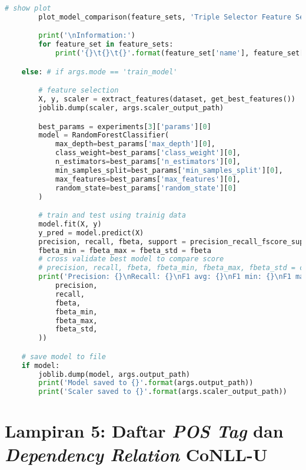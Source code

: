 \begin{lstlisting}[language=Python]
        # show plot
        plot_model_comparison(feature_sets, 'Triple Selector Feature Sets Performance', cv, score_field='cv_score')

        print('\nInformation:')
        for feature_set in feature_sets:
            print('{}\t{}\t{}'.format(feature_set['name'], feature_set['desc'], feature_set['features']))

    else: # if args.mode == 'train_model'

        # feature selection
        X, y, scaler = extract_features(dataset, get_best_features())
        joblib.dump(scaler, args.scaler_output_path)

        best_params = experiments[3]['params'][0]
        model = RandomForestClassifier(
            max_depth=best_params['max_depth'][0],
            class_weight=best_params['class_weight'][0],
            n_estimators=best_params['n_estimators'][0],
            min_samples_split=best_params['min_samples_split'][0],
            max_features=best_params['max_features'][0],
            random_state=best_params['random_state'][0]
        )

        # train and test using trainig data
        model.fit(X, y)
        y_pred = model.predict(X)
        precision, recall, fbeta, support = precision_recall_fscore_support(y, y_pred, average='binary')
        fbeta_min = fbeta_max = fbeta_std = fbeta
        # cross validate best model to compare score
        # precision, recall, fbeta, fbeta_min, fbeta_max, fbeta_std = cross_validate_precision_recall_fbeta(model, X, y, cv)
        print('Precision: {}\nRecall: {}\nF1 avg: {}\nF1 min: {}\nF1 max: {}\nF1 std: {}\n'.format(
            precision,
            recall,
            fbeta,
            fbeta_min,
            fbeta_max,
            fbeta_std,
        ))

    # save model to file
    if model:
        joblib.dump(model, args.output_path)
        print('Model saved to {}'.format(args.output_path))
        print('Scaler saved to {}'.format(args.scaler_output_path))
\end{lstlisting}


\chapter*{Lampiran 5: Daftar \textit{POS Tag} dan \textit{Dependency Relation} CoNLL-U}

